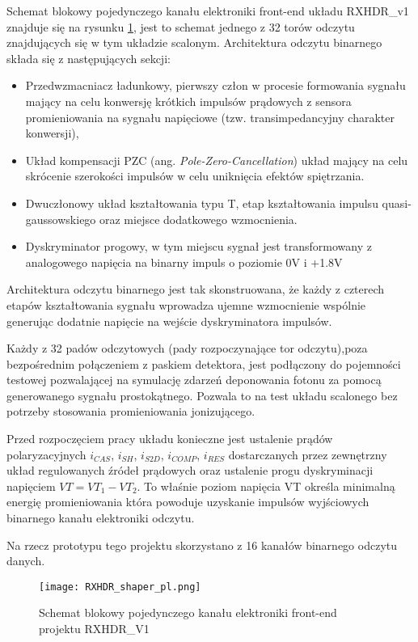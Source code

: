 Schemat blokowy pojedynczego kanału elektroniki front-end układu RXHDR\_v1 znajduje się na rysunku \ref{RXHDR schema}, jest to schemat jednego z 32 torów odczytu znajdujących się w tym układzie scalonym.  Architektura odczytu binarnego składa się z następujących sekcji:
\begin{itemize}
        \item Przedwzmacniacz ładunkowy, pierwszy człon w procesie formowania sygnału mający na celu konwersję krótkich impulsów prądowych z sensora promieniowania na sygnału napięciowe (tzw. transimpedancyjny charakter konwersji),
        \item Układ kompensacji PZC (ang. \textit{Pole-Zero-Cancellation}) układ mający na celu skrócenie szerokości impulsów w celu uniknięcia efektów spiętrzania.
        \item Dwuczłonowy układ kształtowania typu T, etap kształtowania impulsu quasi-gaussowskiego oraz miejsce dodatkowego wzmocnienia. 
        \item Dyskryminator progowy, w tym miejscu sygnał jest transformowany z analogowego napięcia na binarny impuls o poziomie 0V i +1.8V
\end{itemize}

Architektura odczytu binarnego jest tak skonstruowana, że każdy z czterech etapów kształtowania sygnału wprowadza ujemne wzmocnienie wspólnie generując dodatnie napięcie na wejście dyskryminatora impulsów. 

Każdy z 32 padów odczytowych (pady rozpoczynające tor odczytu),poza bezpośrednim połączeniem z paskiem detektora, jest podłączony do pojemności testowej pozwalającej na symulację zdarzeń deponowania fotonu za pomocą generowanego sygnału prostokątnego. Pozwala to na test układu scalonego bez potrzeby stosowania promieniowania jonizującego. 

Przed rozpoczęciem pracy układu konieczne jest ustalenie prądów polaryzacyjnych $i_{CAS}$, $i_{SH}$, $i_{S2D}$, $i_{COMP}$, $i_{RES}$ dostarczanych przez zewnętrzny układ regulowanych źródeł prądowych\cite{master} oraz ustalenie progu dyskryminacji napięciem $VT = VT_1 - VT_2$. To właśnie poziom napięcia VT określa minimalną energię promieniowania która powoduje uzyskanie impulsów wyjściowych binarnego kanału elektroniki odczytu. 

Na rzecz prototypu tego projektu skorzystano z 16 kanałów binarnego odczytu danych.

\begin{figure}
        \texttt{[image: RXHDR\_shaper\_pl.png]}
        \caption{Schemat blokowy pojedynczego kanału elektroniki front-end projektu RXHDR\_V1}
        \label{RXHDR schema}
\end{figure}

